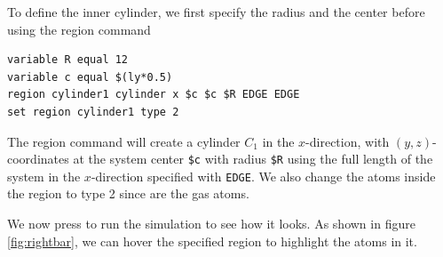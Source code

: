 \documentclass[12pt,a4paper,final]{iopart}
\newcommand{\code}[1]{\colorbox{light-gray}{\color{RawSienna}\texttt{#1}}}
\begin{document}
To define the inner cylinder, we first specify the radius and the center before using the region command
\begin{lstlisting}
variable R equal 12
variable c equal $(ly*0.5)
region cylinder1 cylinder x $c $c $R EDGE EDGE
set region cylinder1 type 2
\end{lstlisting}
The region command will create a cylinder $C_1$ in the $x$-direction, with $(y,z)$-coordinates at the 
system center \code{\$c} with radius \code{\$R} using the full length of the system in the $x$-direction specified with \code{EDGE}.
We also change the atoms inside the region to type 2 since are the gas atoms.

We now press  to run the simulation to see how it looks.
As shown in figure \ref{fig:rightbar}, we can hover the specified region to highlight the atoms in it.
\end{document}
